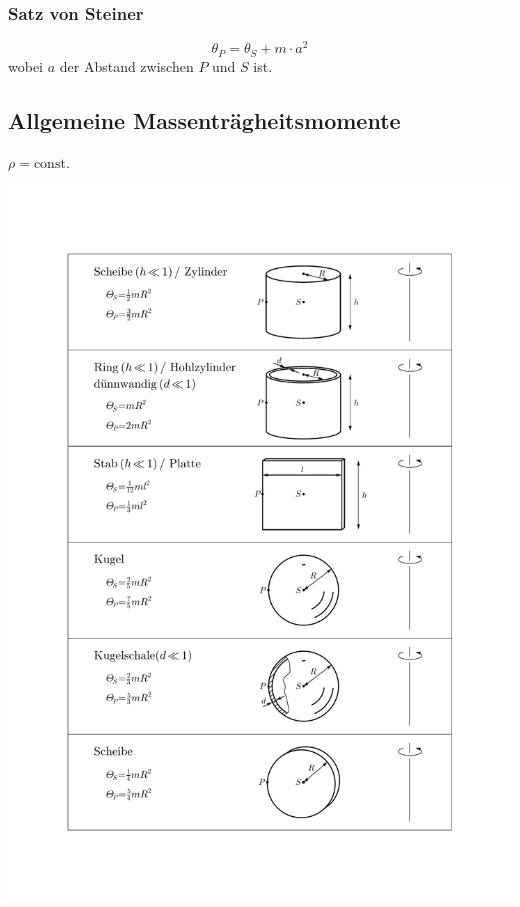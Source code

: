 \documentclass[9pt,fleqn,ngerman,article]{memoir}
\begin{document}
\begin{multicols*}{3}
				\subsubsection{Satz von Steiner} %
					\[
						\theta_P = \theta_S + m \cdot a^2
					\]
					wobei $a$ der Abstand zwischen $P$ und $S$ ist.
				
				\subsection{Allgemeine Massenträgheitsmomente} %
				
					$\rho = \text{const}.$
					
					\begin{center}
						\includegraphics[width=\columnwidth]{grafiken/massentraegheitsmomente}
					\end{center}
					

\end{multicols*}
\end{document}
